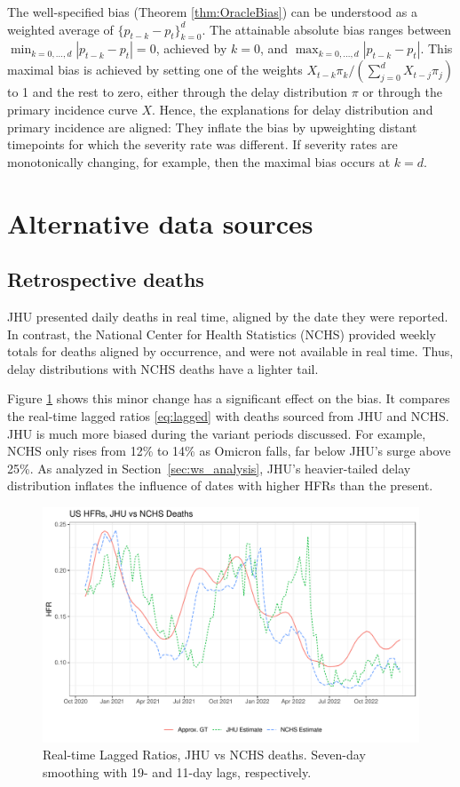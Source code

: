 \documentclass{article}
\begin{document}
The well-specified bias (Theorem \ref{thm:OracleBias}) can be understood as a weighted average of $\{p_{t-k}-p_t\}_{k=0}^d$. The attainable absolute bias ranges between $\min_{k=0, \dotsc, d} |p_{t-k}-p_t| = 0$, achieved by $k=0$, and $\max_{k=0, \dotsc, d} |p_{t-k}-p_t|$. This maximal bias is achieved by setting one of the weights
$X_{t-k}\pi_k/(\sum_{j=0}^d X_{t-j}\pi_j)$ to 1 and the rest to zero,
either through the delay distribution $\pi$ or through the primary incidence curve $X$. Hence, the explanations for delay distribution and primary incidence are aligned: They inflate the bias by upweighting distant timepoints for which the severity rate was different. If severity rates are monotonically changing, for example, then the maximal bias occurs at $k=d$. 


\section{Alternative data sources}
\subsection{Retrospective deaths}\label{apx:NCHS_deaths}

JHU presented daily deaths in real time, aligned by the date they were reported. In contrast, the National Center for Health Statistics (NCHS) provided weekly totals for deaths aligned by occurrence, and were not available in real time. Thus, delay distributions with NCHS deaths have a lighter tail. 

Figure \ref{fig:jhu_vs_nchs} shows this minor change has a significant effect on the bias. It compares the real-time lagged ratios \eqref{eq:lagged} with deaths sourced from JHU and NCHS. JHU is much more biased during the variant periods discussed. For example, NCHS only rises from 12\% to 14\% as Omicron falls, far below JHU's surge above 25\%. As analyzed in Section~\ref{sec:ws_analysis}, JHU's heavier-tailed delay distribution inflates the influence of dates with higher HFRs than the present.


\begin{figure}
    \centering
    \includegraphics[width=0.7\linewidth]{Figs/Real/jhu_vs_nchs.pdf}
    \caption{Real-time Lagged Ratios, JHU vs NCHS deaths. Seven-day smoothing with 19- and 11-day lags, respectively.}
    \label{fig:jhu_vs_nchs}
\end{figure}
\end{document}
